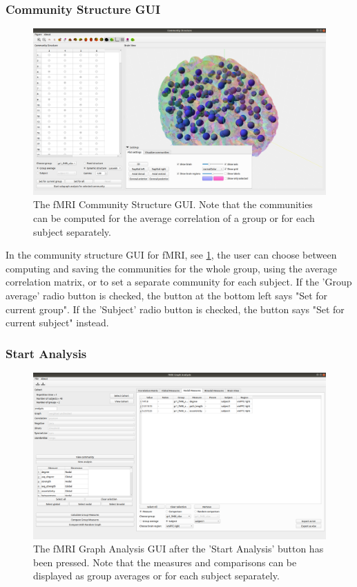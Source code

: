 \documentclass{article}
\begin{document}
\subsubsection{Community Structure GUI}

\begin{figure}[h]
    \centering
    \includegraphics[width=\linewidth]{fmri_cs.png}
    \caption{The fMRI Community Structure GUI. Note that the communities can be computed for the average correlation of a group or for each subject separately.}
    \label{fig:fmri_cs}
\end{figure}


In the community structure GUI for fMRI, see \cref{fig:fmri_cs}, the user can choose between computing and saving the communities for the whole group, using the average correlation matrix, or to set a separate community for each subject. If the 'Group average' radio button is checked, the button at the bottom left says "Set for current group". If the 'Subject' radio button is checked, the button says "Set for current subject" instead. 

\subsubsection{Start Analysis}

\begin{figure}[h]
    \centering
    \includegraphics[width=\linewidth]{fmri_sa.png}
    \caption{The fMRI Graph Analysis GUI after the 'Start Analysis' button has been pressed. Note that the measures and comparisons can be displayed as group averages or for each subject separately.}
    \label{fig:fmri_sa}
\end{figure}
\end{document}
